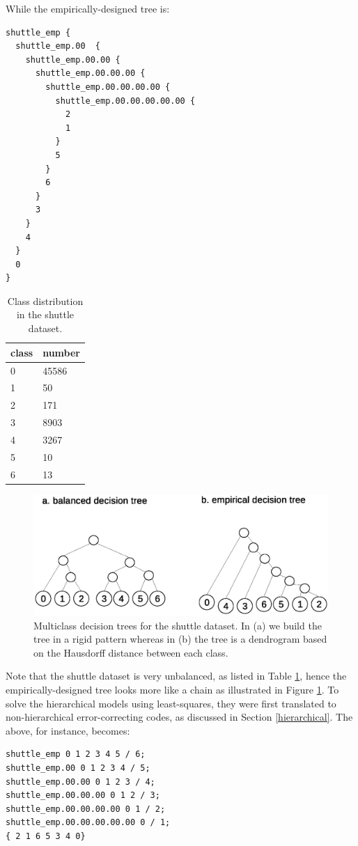 While the empirically-designed tree is:
\begin{verbatim}
shuttle_emp {
  shuttle_emp.00  {
    shuttle_emp.00.00 {
      shuttle_emp.00.00.00 {
        shuttle_emp.00.00.00.00 {
          shuttle_emp.00.00.00.00.00 {
            2
            1
          }
          5
        }
        6
      }
      3
    }
    4
  }
  0
}
\end{verbatim}

\begin{table}
	\caption{Class distribution in the shuttle dataset.}
	\label{shuttle_dist}
	\begin{center}
	\begin{tabular}{|ll|}
		\hline
		class & number \\
		\hline
		0 & 45586 \\
		1 & 50 \\
		2 & 171 \\
		3 & 8903 \\
		4 & 3267 \\
		5 & 10 \\
		6 & 13 \\
		\hline
	\end{tabular}
	\end{center}
\end{table}

\begin{figure}
	\includegraphics[width=\textwidth]{shuttle_tree.eps}
	\caption{Multiclass decision trees for the shuttle dataset. 
	In (a) we build the tree in a rigid pattern whereas in (b) the tree is a dendrogram based on the Hausdorff distance between each class.}\label{shuttle_tree}
\end{figure}

Note that the shuttle dataset is very unbalanced, 
as listed in Table \ref{shuttle_dist},
hence  the empirically-designed tree looks more like a chain
as illustrated in Figure \ref{shuttle_tree}.
To solve the hierarchical models using least-squares, they were first translated to non-hierarchical error-correcting codes, 
as discussed in Section \ref{hierarchical}.
The above, for instance, becomes:
\begin{verbatim}
shuttle_emp 0 1 2 3 4 5 / 6;
shuttle_emp.00 0 1 2 3 4 / 5;
shuttle_emp.00.00 0 1 2 3 / 4;
shuttle_emp.00.00.00 0 1 2 / 3;
shuttle_emp.00.00.00.00 0 1 / 2;
shuttle_emp.00.00.00.00.00 0 / 1;
{ 2 1 6 5 3 4 0}
\end{verbatim}

